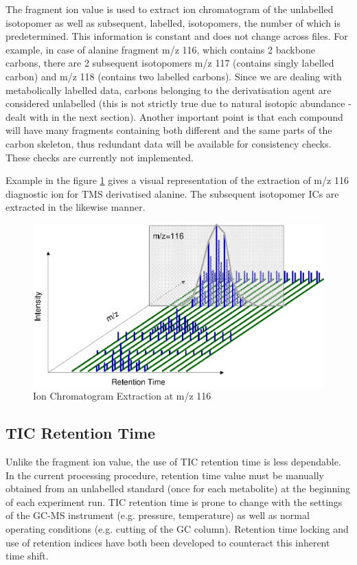 The fragment ion value is used to extract ion chromatogram of the unlabelled 
isotopomer as well as subsequent, labelled, isotopomers, the number of which is 
predetermined. This information is constant and does not change across files. 
For example, in case of alanine fragment m/z 116, which contains 2 backbone 
carbons, there are 2 subsequent isotopomers m/z 117 (contains singly labelled 
carbon) and m/z 118 (contains two labelled carbons). Since we are dealing with 
metabolically labelled data, carbons belonging to the derivatisation agent are 
considered unlabelled (this is not strictly true due to natural isotopic 
abundance - dealt with in the next section).  Another important point is that 
each compound will have many fragments containing both different and the same 
parts of the carbon skeleton, thus redundant data will be available for 
consistency checks. These checks are currently not implemented. 

Example in the figure \ref{fig:82} gives a visual representation of the 
extraction of m/z 116 diagnostic ion for TMS derivatised alanine. The 
subsequent isotopomer ICs are extracted in the likewise manner.

\begin{figure}
  \begin{center}
    \includegraphics[scale=0.7]{graphics/chapter08/82.eps}
  \end{center}
  \caption{Ion Chromatogram Extraction at m/z 116}
  \label{fig:82}
\end{figure}

\subsection{TIC Retention Time}

Unlike the fragment ion value, the use of TIC retention time is less dependable. 
In the current processing procedure, retention time value must be manually 
obtained from an unlabelled standard (once for each metabolite) at the 
beginning of each experiment run. TIC retention time is prone to change with 
the settings of the GC-MS instrument (e.g. pressure, temperature) as well as 
normal operating conditions (e.g. cutting of the GC column). Retention time 
locking and use of retention indices have both been developed to counteract 
this inherent time shift. 

